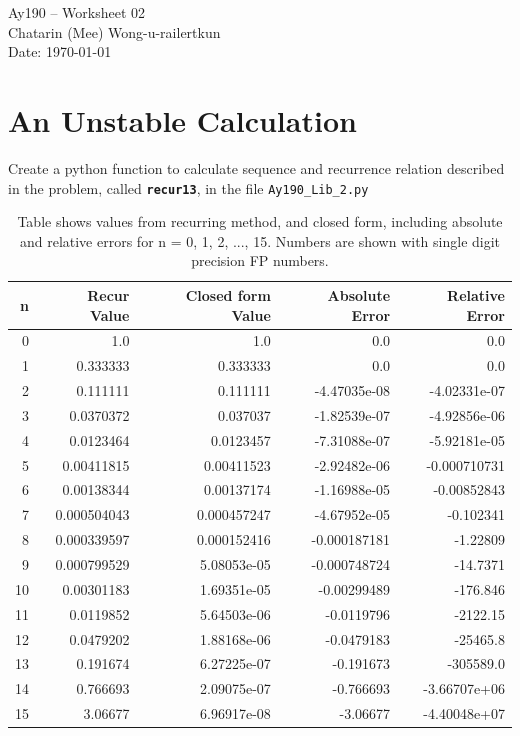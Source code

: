 \documentclass[11pt,letterpaper]{article}
\begin{document}
\begin{center}
\Large
Ay190 -- Worksheet 02 \\    %
Chatarin (Mee) Wong-u-railertkun\\
Date: \today
\end{center}


\section{An Unstable Calculation}
Create a python function to calculate sequence and recurrence relation described in the problem, called
\texttt{\bf recur13}, in the file \texttt{Ay190\_Lib\_2.py}

\begin{table}[h]
	\centering
	\begin{tabular}{r | r | r | r | r}
		n & Recur Value & Closed form Value & Absolute Error & Relative Error \\
		\hline
		\hline
		0 & 1.0 & 1.0 & 0.0 & 0.0 \\
		1 & 0.333333 & 0.333333 & 0.0 & 0.0 \\
		2 & 0.111111 & 0.111111 & -4.47035e-08 & -4.02331e-07 \\
		3 & 0.0370372 & 0.037037 & -1.82539e-07 & -4.92856e-06 \\
		4 & 0.0123464 & 0.0123457 & -7.31088e-07 & -5.92181e-05 \\
		5 & 0.00411815 & 0.00411523 & -2.92482e-06 & -0.000710731 \\
		6 & 0.00138344 & 0.00137174 & -1.16988e-05 & -0.00852843 \\
		7 & 0.000504043 & 0.000457247 & -4.67952e-05 & -0.102341 \\
		8 & 0.000339597 & 0.000152416 & -0.000187181 & -1.22809 \\
		9 & 0.000799529 & 5.08053e-05 & -0.000748724 & -14.7371 \\
		10 & 0.00301183 & 1.69351e-05 & -0.00299489 & -176.846 \\
		11 & 0.0119852 & 5.64503e-06 & -0.0119796 & -2122.15 \\
		12 & 0.0479202 & 1.88168e-06 & -0.0479183 & -25465.8 \\
		13 & 0.191674 & 6.27225e-07 & -0.191673 & -305589.0 \\
		14 & 0.766693 & 2.09075e-07 & -0.766693 & -3.66707e+06 \\
		15 & 3.06677 & 6.96917e-08 & -3.06677 & -4.40048e+07 \\
		\hline
	\end{tabular}
	\caption{Table shows values from recurring method, and closed form, including absolute and relative errors for n = 0, 1, 2, ..., 15.
	Numbers are shown with single digit precision FP numbers.}
	\label{tab:Recurring}
\end{table}
\end{document}
